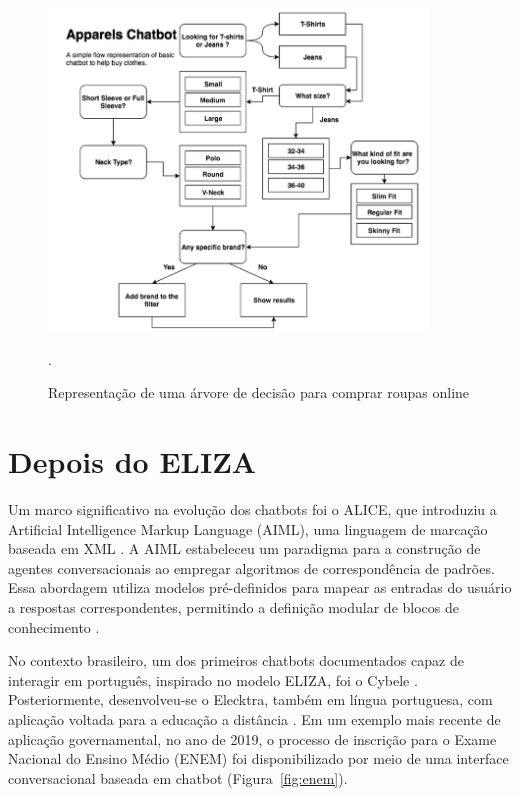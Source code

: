 \documentclass[a4paper,oneside]{book}
\begin{document}
\begin{figure}
\caption{Representação de uma árvore de decisão para comprar roupas online}
\vspace{0.5cm}
    \centering
   	\vspace*{0,2cm}
    \includegraphics[width=0.9\textwidth]{./04-figuras/image14}
    \label{fig:representacaodeumaarvore}
	{
	
	\cite{Raj2019}.}
\end{figure}

\section{Depois do ELIZA}

Um marco significativo na evolução dos chatbots foi o ALICE, que introduziu a Artificial Intelligence Markup Language (AIML), uma linguagem de marcação baseada em XML \cite{Wallace2000}. A AIML estabeleceu um paradigma para a construção de agentes conversacionais ao empregar algoritmos de correspondência de padrões. Essa abordagem utiliza modelos pré-definidos para mapear as entradas do usuário a respostas correspondentes, permitindo a definição modular de blocos de conhecimento \cite{Wallace2000}.

No contexto brasileiro, um dos primeiros chatbots documentados capaz de interagir em português, inspirado no modelo ELIZA, foi o Cybele \cite{primo2001chatterbot}. Posteriormente, desenvolveu-se o Elecktra, também em língua portuguesa, com aplicação voltada para a educação a distância \cite{Leonhardt2003}. Em um exemplo mais recente de aplicação governamental, no ano de 2019, o processo de inscrição para o Exame Nacional do Ensino Médio (ENEM) foi disponibilizado por meio de uma interface conversacional baseada em chatbot (Figura~\ref{fig:enem}).
\end{document}
